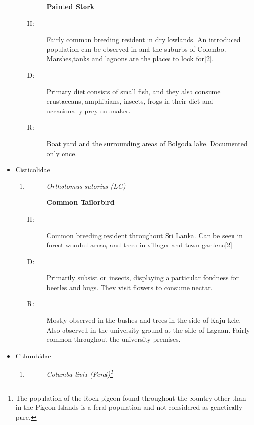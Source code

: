 \begin{itemize}
\begin{enumerate}
\begin{description}
\item[]%
\textbf{Painted Stork}%
\end{description}%
\begin{description}%
\item[H: ]%
Fairly common breeding resident in dry lowlands. An introduced population can be observed in and the suburbs of Colombo. Marshes,tanks and lagoons are the places to look for{[}2{]}.%
\item[D: ]%
Primary diet consists of small fish, and they also consume crustaceans, amphibians, insects, frogs in their diet and occasionally prey on snakes.%
\item[R: ]%
Boat yard and the surrounding areas of Bolgoda lake. Documented only once.%
\end{description}%
\end{enumerate}%
\item%
Cisticolidae%
\begin{enumerate}%
\item%
\begin{description}%
\item[]%
\textit{Orthotomus sutorius (LC)}%
\item[]%
\textbf{Common Tailorbird}%
\end{description}%
\begin{description}%
\item[H: ]%
Common breeding resident throughout Sri Lanka. Can be seen in forest wooded areas, and trees in villages and town gardens{[}2{]}.%
\item[D: ]%
Primarily subsist on insects, displaying a particular fondness for beetles and bugs. They visit flowers to consume nectar.%
\item[R: ]%
Mostly observed in the bushes and trees in the side of Kaju kele. Also observed in the university ground at the side of Lagaan. Fairly common throughout the university premises.%
\end{description}%
\end{enumerate}%
\item%
Columbidae%
\begin{enumerate}%
\item%
\begin{description}%
\item[]%
\textit{Columba livia (Feral)\footnote{The population of the Rock pigeon found throughout the country other than in the Pigeon Islands is a feral population and not considered as genetically pure.}}%
\item[]%

\end{description}
\end{enumerate}
\end{itemize}
